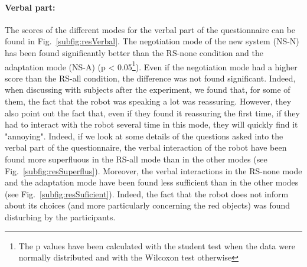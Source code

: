 \documentclass[english,a4paper,11pt,twoside]{StyleThese}
\begin{document}
\paragraph{Verbal part:} 
The scores of the different modes for the verbal part of the questionnaire can be found in Fig.~\ref{subfig:resVerbal}. The negotiation mode of the new system (NS-N) has been found significantly better than the RS-none condition and the adaptation mode (NS-A) (p < 0.05\footnote{The p values have been calculated with the student test when the data were normally distributed and with the Wilcoxon test otherwise}). Even if the negotiation mode had a higher score than the RS-all condition, the difference was not found significant. Indeed, when discussing with subjects after the experiment, we found that, for some of them, the fact that the robot was speaking a lot was reassuring. However, they also point out the fact that, even if they found it reassuring the first time, if they had to interact with the robot several time in this mode, they will quickly find it "annoying". Indeed, if we look at some details of the questions asked into the verbal part of the questionnaire, the verbal interaction of the robot have been found more superfluous in the RS-all mode than in the other modes (see Fig.~\ref{subfig:resSuperflus}). Moreover, the verbal interactions in the RS-none mode and the adaptation mode have been found less sufficient than in the other modes (see Fig.~\ref{subfig:resSuficient}). Indeed, the fact that the robot does not inform about its choices (and more particularly concerning the red objects) was found disturbing by the participants. 
\end{document}
